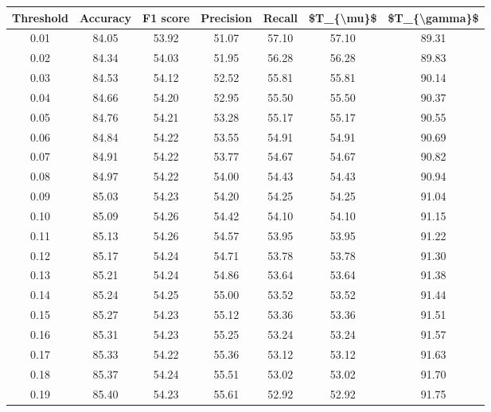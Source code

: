 \begin{tabular}{|c|c|c|c|c|c|c|}
\hline
 Threshold &  Accuracy &  F1 score &  Precision &  Recall &  \$T\_\{\textbackslash mu\}\$ &  \$T\_\{\textbackslash gamma\}\$ \\
\hline
      0.01 &     84.05 &     53.92 &      51.07 &   57.10 &      57.10 &         89.31 \\
      0.02 &     84.34 &     54.03 &      51.95 &   56.28 &      56.28 &         89.83 \\
      0.03 &     84.53 &     54.12 &      52.52 &   55.81 &      55.81 &         90.14 \\
      0.04 &     84.66 &     54.20 &      52.95 &   55.50 &      55.50 &         90.37 \\
      0.05 &     84.76 &     54.21 &      53.28 &   55.17 &      55.17 &         90.55 \\
      0.06 &     84.84 &     54.22 &      53.55 &   54.91 &      54.91 &         90.69 \\
      0.07 &     84.91 &     54.22 &      53.77 &   54.67 &      54.67 &         90.82 \\
      0.08 &     84.97 &     54.22 &      54.00 &   54.43 &      54.43 &         90.94 \\
      0.09 &     85.03 &     54.23 &      54.20 &   54.25 &      54.25 &         91.04 \\
      0.10 &     85.09 &     54.26 &      54.42 &   54.10 &      54.10 &         91.15 \\
      0.11 &     85.13 &     54.26 &      54.57 &   53.95 &      53.95 &         91.22 \\
      0.12 &     85.17 &     54.24 &      54.71 &   53.78 &      53.78 &         91.30 \\
      0.13 &     85.21 &     54.24 &      54.86 &   53.64 &      53.64 &         91.38 \\
      0.14 &     85.24 &     54.25 &      55.00 &   53.52 &      53.52 &         91.44 \\
      0.15 &     85.27 &     54.23 &      55.12 &   53.36 &      53.36 &         91.51 \\
      0.16 &     85.31 &     54.23 &      55.25 &   53.24 &      53.24 &         91.57 \\
      0.17 &     85.33 &     54.22 &      55.36 &   53.12 &      53.12 &         91.63 \\
      0.18 &     85.37 &     54.24 &      55.51 &   53.02 &      53.02 &         91.70 \\
      0.19 &     85.40 &     54.23 &      55.61 &   52.92 &      52.92 &         91.75 \\

\end{tabular}
